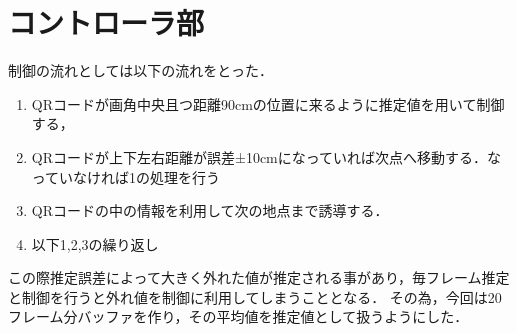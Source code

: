 \section{コントローラ部}
\label{implement_controller}
制御の流れとしては以下の流れをとった．

\begin{enumerate}
    \item QRコードが画角中央且つ距離90cmの位置に来るように推定値を用いて制御する，
    \item QRコードが上下左右距離が誤差±10cmになっていれば次点へ移動する．なっていなければ1の処理を行う
    \item QRコードの中の情報を利用して次の地点まで誘導する．
    \item 以下1,2,3の繰り返し
\end{enumerate}

この際推定誤差によって大きく外れた値が推定される事があり，毎フレーム推定と制御を行うと外れ値を制御に利用してしまうこととなる．
その為，今回は20フレーム分バッファを作り，その平均値を推定値として扱うようにした．